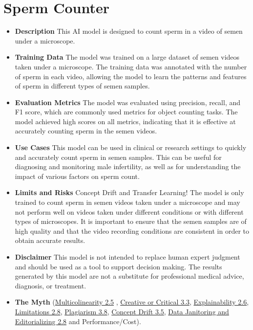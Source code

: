 \section{Sperm Counter}
\begin{itemize}
\item \textbf{Description} This AI model is designed to count sperm in a video of semen under a microscope.
\item \textbf{Training Data} The model was trained on a large dataset of semen videos taken under a microscope. The training data was annotated with the number of sperm in each video, allowing the model to learn the patterns and features of sperm in different types of semen samples.
\item \textbf{Evaluation Metrics} The model was evaluated using precision, recall, and F1 score, which are commonly used metrics for object counting tasks. The model achieved high scores on all metrics, indicating that it is effective at accurately counting sperm in the semen videos.
\item \textbf{Use Cases} This model can be used in clinical or research settings to quickly and accurately count sperm in semen samples. This can be useful for diagnosing and monitoring male infertility, as well as for understanding the impact of various factors on sperm count.
\item \textbf{Limits and Risks} Concept Drift and Transfer Learning! The model is only trained to count sperm in semen videos taken under a microscope and may not perform well on videos taken under different conditions or with different types of microscopes. It is important to ensure that the semen samples are of high quality and that the video recording conditions are consistent in order to obtain accurate results.
\item \textbf{Disclaimer} This model is not intended to replace human expert judgment and should be used as a tool to support decision making. The results generated by this model are not a substitute for professional medical advice, diagnosis, or treatment.
\item \textbf{The Myth} (\hyperref[sec:multi]{Multicolinearity 2.5} , \hyperref[sec:creative]{Creative or Critical 3.3}, \hyperref[sec:explain]{Explainability 2.6}, \hyperref[sec:limits]{Limitations 2.8}, \hyperref[sec:plag]{Plagiarism 3.8}, \hyperref[sec:drift]{Concept Drift 3.5}, \hyperref[sec:janitor]{Data Janitoring and Editorializing 2.8} and Performance/Cost).
\end{itemize}

